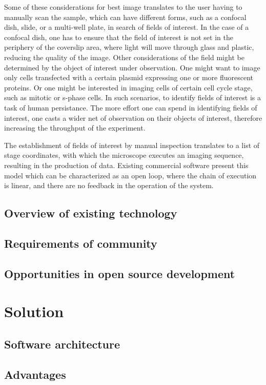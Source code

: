 Some of these considerations for best image translates to the user having to manually scan the sample, which can have different forms, such as a confocal dish, slide, or a multi-well plate, in search of fields of interest. In the case of a confocal dish, one has to ensure that the field of interest is not set in the periphery of the coverslip area, where light will move through glass and plastic, reducing the quality of the image. Other considerations of the field might be determined by the object of interest under observation. One might want to image only cells transfected with a certain plasmid expressing one or more fluorescent proteins. Or one might be interested in imaging cells of certain cell cycle stage, such as mitotic or s-phase cells. In such scenarios, to identify fields of interest is a task of human persistance. The more effort one can spend in identifying fields of interest, one casts a wider net of observation on their objects of interest, therefore increasing the throughput of the experiment.

The establishment of fields of interest by manual inspection translates to a list of stage coordinates, with which the microscope executes an imaging sequence, resulting in the production of data. Existing commercial software present this model which can be characterized as an open loop, where the chain of execution is linear, and there are no feedback in the operation of the system.

\subsection{Overview of existing technology}
\subsection{Requirements of community}
\subsection{Opportunities in open source development}
\section{Solution}
\subsection{Software architecture}
\subsection{Advantages}
